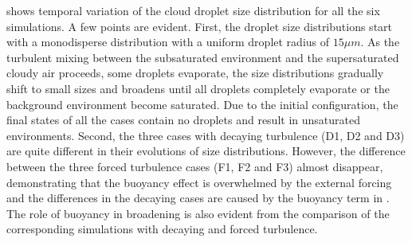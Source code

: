  shows temporal variation of the cloud droplet size distribution for all the six simulations. A few points are evident. First, the droplet size distributions start with a monodisperse distribution with a uniform droplet radius of $15\mu m$. As the turbulent mixing between the subsaturated environment and the supersaturated cloudy air proceeds, some droplets evaporate, the size distributions gradually shift to small sizes and broadens until all droplets completely evaporate or the background environment become saturated. Due to the initial configuration, the final states of all the cases contain no droplets and result in unsaturated environments. Second, the three cases with decaying turbulence (D1, D2 and D3) are quite different in their evolutions of size distributions. However, the difference between the three forced turbulence cases (F1, F2 and F3) almost disappear, demonstrating that the buoyancy effect is overwhelmed by the external forcing and the differences in the decaying cases are caused by the buoyancy term in . The role of buoyancy in broadening is also evident from the comparison of the corresponding simulations with decaying and forced turbulence.
